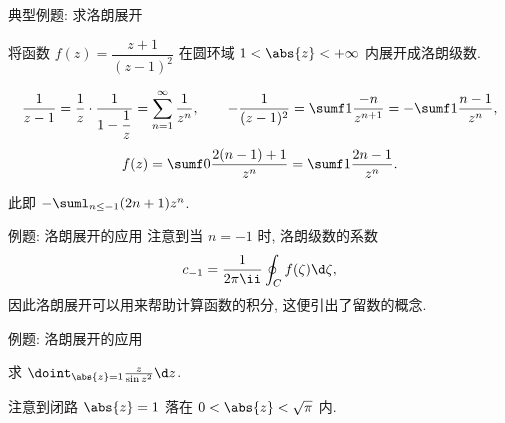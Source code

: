 \begin{frame}{典型例题: 求洛朗展开}
	\onslide<+->
	\begin{exercise}
		将函数 $f(z)=\dfrac{z+1}{(z-1)^2}$ 在圆环域 $1<\abs{z}<+\infty$ 内展开成洛朗级数.
	\end{exercise}
	\onslide<+->
	\begin{answer}
		\begin{align*}
			\frac1{z-1}=\frac1z\cdot\frac1{1-\dfrac1z}=\sum_{n=1}^{\infty} \frac1{z^n},\qquad
			-\frac1{(z-1)^2}=\sumf1 \frac{-n}{z^{n+1}}=-\sumf1 \frac{n-1}{z^n},
		\end{align*}
		\[
			f(z)=\sumf0 \frac{2(n-1)+1}{z^n}
			=\sumf1\frac{2n-1}{z^n}.
		\]
	\end{answer}
	\onslide<+->
	此即 $-\suml_{n\le -1}(2n+1)z^n$.
\end{frame}


\begin{frame}{例题: 洛朗展开的应用}
	\onslide<+->
	注意到当 $n=-1$ 时, 洛朗级数的系数
	\[c_{-1}=\frac1{2\pi\ii}\oint_C f(\zeta)\d\zeta,
	\]
	\onslide<+->
	因此洛朗展开可以用来帮助计算函数的积分,
	\onslide<+->
	这便引出了\alert{留数}的概念.
\end{frame}






\begin{frame}{例题: 洛朗展开的应用}
	\onslide<+->
	\begin{example}[nearnext]
		求 $\doint_{\abs{z}=1}\frac{z}{\sin z^2}\d z$.
	\end{example}
	\onslide<+->
	\begin{solution}[nearprev]
		注意到闭路 $\abs{z}=1$ 落在 $0<\abs{z}<\sqrt \pi$ 内.
		\onslide<+->{%
			\[
				f(z)=\frac{z}{\sin z^2}
				=\frac{z}{z^2-\dfrac{z^6}{3!}+\dfrac{z^{10}}{5!}+\cdots}
				\onslide<+->{=\frac1z+\frac{z^3}6+\cdots}
			\]
		}\onslide<+->{%
			故 $\doint_Cf(z)\d z=2\pi\ii c_{-1}=2\pi\ii$.
		}
	\end{solution}
\end{frame}
